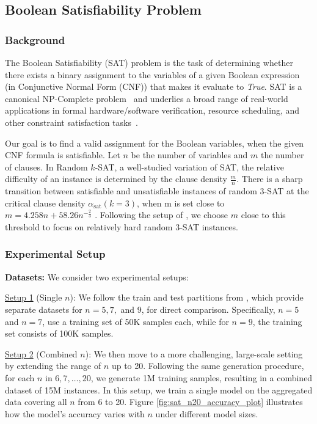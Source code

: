 \subsection{Boolean Satisfiability Problem}

\subsubsection{Background} The Boolean Satisfiability (SAT) problem is the task of determining whether there exists a binary assignment to the variables of a given Boolean expression (in Conjunctive Normal Form (CNF)) that makes it evaluate to \textit{True}. SAT is a canonical NP-Complete problem~\cite{cook1971complexity} and underlies a broad range of real-world applications in formal hardware/software verification, resource scheduling, and other constraint satisfaction tasks~\cite{clarke2001modelchecking, gomes2008satisfiability, vizel2015satmodelchecking}.

Our goal is to find a valid assignment for the Boolean variables, when the given CNF formula is satisfiable. Let $n$ be the number of variables and $m$ the number of clauses. In Random $k$-SAT, a well-studied variation of SAT, the relative difficulty of an instance is determined by the clause density $\frac{m}{n}$. There is a sharp transition between satisfiable and unsatisfiable instances of random 3-SAT at the critical clause density $\alpha_{\mathrm{sat}}(k=3)$, when m is set close to $m=4.258n + 58.26 n^{-\frac{2}{3}}$ \cite{ding2015satisfiabilityconjecture}. Following the setup of \cite{ye2024autoregressiondiscretediffusioncomplex}, we choose $m$ close to this threshold to focus on relatively hard random 3-SAT instances.

\subsubsection{Experimental Setup}
\textbf{Datasets:}
We consider two experimental setups:

\underline{Setup 1} (Single $n$): We follow the train and test partitions from \cite{ye2024autoregressiondiscretediffusioncomplex}, which provide separate datasets for $n \!= 5, 7,$ and $9$, for direct comparison. Specifically, $n=5$ and $n=7$, use a training set of 50K samples each, while for $n=9$, the training set consists of 100K samples.

\underline{Setup 2} (Combined $n$): We then move to a more challenging, large-scale setting by extending the range of $n$ up to 20. Following the same generation procedure, for each $n$ in ${6,7,\dots,20}$, we generate 1M training samples, resulting in a combined dataset of 15M instances. In this setup, we train a single model on the aggregated data covering all $n$ from 6 to 20. Figure \ref{fig:sat_n20_accuracy_plot} illustrates how the model's accuracy varies with $n$ under different model sizes.

